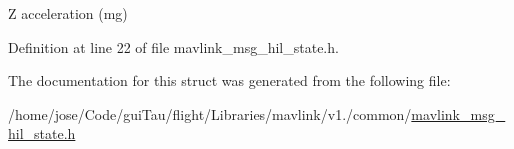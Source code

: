 Z acceleration (mg) 



Definition at line 22 of file mavlink\-\_\-msg\-\_\-hil\-\_\-state.\-h.



The documentation for this struct was generated from the following file\-:\begin{DoxyCompactItemize}
\item 
/home/jose/\-Code/gui\-Tau/flight/\-Libraries/mavlink/v1./common/\hyperlink{mavlink__msg__hil__state_8h}{mavlink\-\_\-msg\-\_\-hil\-\_\-state.\-h}\end{DoxyCompactItemize}
